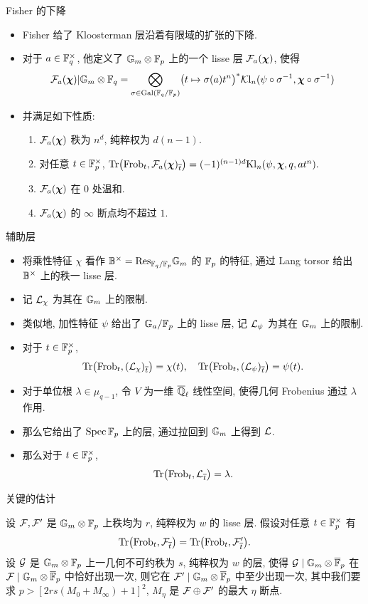 \documentclass[aspectratio=169,handout]{ctexbeamer}
\newcommand\bchi{{\boldsymbol\chi}}
\begin{document}
\begin{frame}{Fisher 的下降}
	\begin{itemize}
		\item Fisher 给了 Kloosterman 层沿着有限域的扩张的下降.
		\item 对于 $a\in{\mathbb{F}}_q^\times$, 他定义了 $\mathbb{G}_m\otimes{\mathbb{F}}_p$ 上的一个 lisse 层 $\CF_a(\bchi)$, 使得
		\[
			\CF_a(\bchi)|\Gm\otimes\BF_q=\bigotimes\limits_{\sigma\in\Gal(\BF_q/\BF_p)} \bigl(t\mapsto \sigma(a)t^n\bigr)^*\CKl_n(\psi\circ\sigma^{-1},\bchi\circ\sigma^{-1})
		\]
		\item 并满足如下性质:
		\begin{enumerate}
			\item $\CF_a(\bchi)$ 秩为 $n^d$, 纯粹权为 $d(n-1)$.
			\item 对任意 $t\in{\mathbb{F}}_p^\times$,
				$\Tr\bigl(\Frob_t,\CF_a(\bchi)_{\ov t}\bigr)=(-1)^{(n-1)d}\Kl_n(\psi,\bchi,q,at^n).$
			\item $\CF_a(\bchi)$ 在 $0$ 处温和.
			\item $\CF_a(\bchi)$ 的 $\infty$ 断点均不超过 $1$.
		\end{enumerate}
	\end{itemize}
\end{frame}


\begin{frame}{辅助层}
	\begin{itemize}
		\item 将乘性特征 $\chi$ 看作 ${\mathbb{B}}^\times={\mathrm{Res}}_{{\mathbb{F}}_q/{\mathbb{F}}_p}\mathbb{G}_m$ 的 ${\mathbb{F}}_p$ 的特征, 通过 Lang torsor 给出 ${\mathbb{B}}^\times$ 上的秩一 lisse 层.
		\item 记 ${\mathcal{L}}_\chi$ 为其在 $\mathbb{G}_m$ 上的限制.
		\item 类似地, 加性特征 $\psi$ 给出了 $\mathbb{G}_a/{\mathbb{F}}_p$ 上的 lisse 层, 记 ${\mathcal{L}}_\psi$ 为其在 $\mathbb{G}_m$ 上的限制.
		\item 对于 $t\in{\mathbb{F}}_p^\times$,
		\[
			{\mathrm{Tr}}\bigl({\mathrm{Frob}}_t, ({\mathcal{L}}_\chi)_{\overline t}\bigr)=\chi(t),\quad
			{\mathrm{Tr}}\bigl({\mathrm{Frob}}_t, ({\mathcal{L}}_\psi)_{\overline t}\bigr)=\psi(t).
		\]
		\item 对于单位根 $\lambda\in\mu_{q-1}$, 令 $V$ 为一维 $\overline{{\mathbb{Q}}}_\ell$ 线性空间, 使得几何 Frobenius 通过 $\lambda$ 作用.
		\item 那么它给出了 $\operatorname{Spec} {\mathbb{F}}_p$ 上的层, 通过拉回到 $\mathbb{G}_m$ 上得到 ${\mathcal{L}}$.
		\item 那么对于 $t\in{\mathbb{F}}_p^\times$,
		\[
			{\mathrm{Tr}}\bigl({\mathrm{Frob}}_t, {\mathcal{L}}_{\overline t}\bigr)=\lambda.
		\]
	\end{itemize}
\end{frame}

\begin{frame}{关键的估计}
	\onslide<+->
	\begin{lemma}
		设 ${\mathcal{F}},{\mathcal{F}}'$ 是 $\mathbb{G}_m\otimes{\mathbb{F}}_p$ 上秩均为 $r$, 纯粹权为 $w$ 的 lisse 层.
		假设对任意 $t\in {\mathbb{F}}_p^\times$ 有
		\[
			{\mathrm{Tr}}\bigl({\mathrm{Frob}}_t, {\mathcal{F}}_{\overline t}\bigr)={\mathrm{Tr}}\bigl({\mathrm{Frob}}_t, {\mathcal{F}}'_{\overline t}\bigr).
		\]
		设 ${\mathcal{G}}$ 是 $\mathbb{G}_m\otimes{\mathbb{F}}_p$ 上一几何不可约秩为 $s$, 纯粹权为 $w$ 的层, 使得 ${\mathcal{G}}\mid \mathbb{G}_m\otimes\overline{{\mathbb{F}}}_p$ 在 ${\mathcal{F}}\mid \mathbb{G}_m\otimes\overline {{\mathbb{F}}}_p$ 中恰好出现一次, 则它在 ${\mathcal{F}}'\mid \mathbb{G}_m\otimes\overline {{\mathbb{F}}}_p$ 中至少出现一次, 其中我们要求 $p>[2rs(M_0+M_\infty)+1]^2$, $M_\eta$ 是 ${\mathcal{F}}\oplus {\mathcal{F}}'$ 的最大 $\eta$ 断点.
	\end{lemma}
\end{frame}
\end{document}
